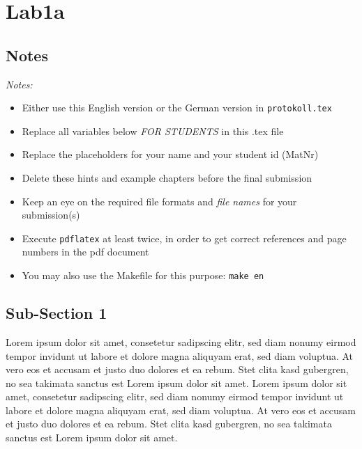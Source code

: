 \documentclass[12pt,a4paper,titlepage,oneside]{scrartcl}
\begin{document}
\maketitle
\setcounter{section}{0}
\setcounter{tocdepth}{2}
\tableofcontents

%
%

\section{Lab1a}

\subsection{Notes}
\emph{Notes:}
\begin{itemize}
    \item Either use this English version or the German version in \lstinline{protokoll.tex}
    \item Replace all variables below \emph{FOR STUDENTS} in this .tex file
    \item Replace the placeholders for your name and your student id (MatNr)
    \item Delete these hints and example chapters before the final submission
    \item Keep an eye on the required file formats and \emph{file names} for your submission(s)
    \item Execute \lstinline{pdflatex} at least twice, in order to get correct references and page numbers in the pdf document
    \item You may also use the Makefile for this purpose: \lstinline{make en}
\end{itemize}

\subsection{Sub-Section 1}
Lorem ipsum dolor sit amet, consetetur sadipscing elitr, sed diam nonumy eirmod tempor invidunt ut labore et dolore magna aliquyam erat, sed diam voluptua. At vero eos et accusam et justo duo dolores et ea rebum. Stet clita kasd gubergren, no sea takimata sanctus est Lorem ipsum dolor sit amet. Lorem ipsum dolor sit amet, consetetur sadipscing elitr, sed diam nonumy eirmod tempor invidunt ut labore et dolore magna aliquyam erat, sed diam voluptua. At vero eos et accusam et justo duo dolores et ea rebum. Stet clita kasd gubergren, no sea takimata sanctus est Lorem ipsum dolor sit amet.
\end{document}
